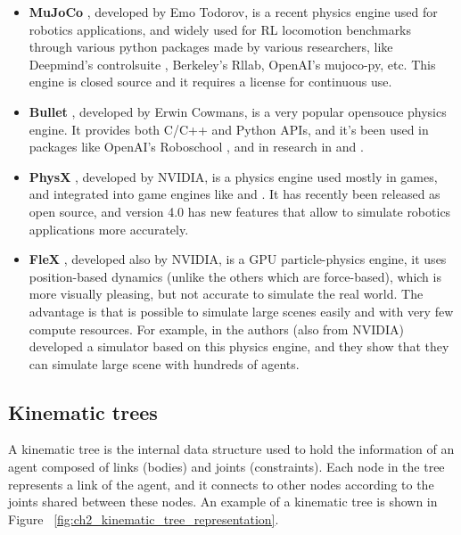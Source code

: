 \begin{itemize}
    \item \textbf{MuJoCo} \citep{MuJoCo}, developed by Emo Todorov, is a recent physics engine
          used for robotics applications, and widely used for RL locomotion benchmarks through
          various python packages made by various researchers, like Deepmind's controlsuite \citep{Controlsuite},
          Berkeley's Rllab, OpenAI's mujoco-py, etc. This engine is closed source and it
          requires a license for continuous use.

    \item \textbf{Bullet} \citep{Bullet}, developed by Erwin Cowmans, is a very popular opensouce
          physics engine. It provides both C/C++ and Python APIs, and it's been used in packages
          like OpenAI's Roboschool \citep{Roboschool}, and in research in \cite{DeepTerrainRL} and \cite{DeepMimic}.

    \item \textbf{PhysX} \citep{PhysX}, developed by NVIDIA, is a physics engine used
          mostly in games, and integrated into game engines like \citeauthor{Unity} and \citeauthor{Unreal}.
          It has recently been released as open source, and version 4.0 has new features
          that allow to simulate robotics applications more accurately.

    \item \textbf{FleX} \citep{FleX}, developed also by NVIDIA, is a GPU particle-physics engine,
          it uses position-based dynamics (unlike the others which are force-based), which is
          more visually pleasing, but not accurate to simulate the real world. The advantage is
          that is possible to simulate large scenes easily and with very few compute resources.
          For example, in \cite{GpuSim} the authors (also from NVIDIA) developed a simulator based on
          this physics engine, and they show that they can simulate large scene with hundreds of
          agents.
\end{itemize}

\subsection{Kinematic trees}

A kinematic tree is the internal data structure used to hold the information of
an agent composed of links (bodies) and joints (constraints). Each node in the 
tree represents a link of the agent, and it connects to other nodes according to
the joints shared between these nodes. An example of a kinematic tree is shown in
Figure ~\ref{fig:ch2_kinematic_tree_representation}. 

